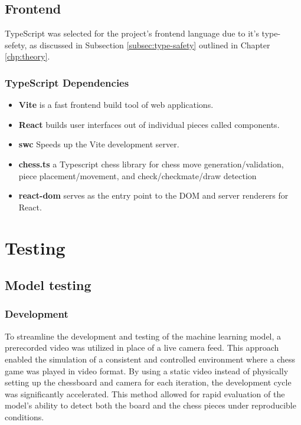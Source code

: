 \subsection*{Frontend}

TypeScript was selected for the project's frontend language due to it's type-sefety, as discussed in Subsection \ref{subsec:type-safety} outlined in Chapter \ref{chp:theory}.

\subsubsection*{TypeScript Dependencies}

\begin{itemize}
    \item \textbf{Vite} is a fast frontend build tool of web applications. \cite{ts:vite}
    
    \item \textbf{React} builds user interfaces out of individual pieces called components. \cite{ts:react}
    
    \item \textbf{\acrshort{swc}} Speeds up the Vite development server. \cite{ts:swc}
    
    \item \textbf{chess.ts} a Typescript chess library for chess move generation/validation, piece placement/movement, and check/checkmate/draw detection \cite{ts:chess}
    
    \item \textbf{react-dom} serves as the entry point to the DOM and server renderers for React. \cite{ts:react-dom}
\end{itemize}

\section{Testing}
\label{sec:testing}

\subsection{Model testing}
\label{subsec:model-testing}

\subsubsection*{Development}
To streamline the development and testing of the machine learning model, a prerecorded video was utilized in place of a live camera feed. This approach enabled the simulation of a consistent and controlled environment where a chess game was played in video format. By using a static video instead of physically setting up the chessboard and camera for each iteration, the development cycle was significantly accelerated. This method allowed for rapid evaluation of the model's ability to detect both the board and the chess pieces under reproducible conditions.

